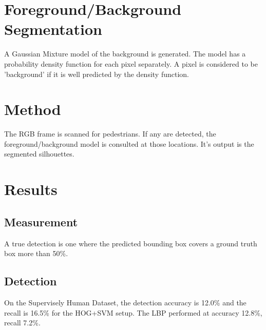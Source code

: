 \documentclass{article}
\begin{document}
\section{Foreground/Background Segmentation}
A Gaussian Mixture model of the background is generated\cite{knn_background_subt}.
The model has a probability density function for each pixel separately.
A pixel is considered to be 'background' if it is well predicted by the density function.


\section{Method}
The RGB frame is scanned for pedestrians.
If any are detected, the foreground/background model is consulted at those locations.
It's output is the segmented silhouettes.


\section{Results}
\subsection{Measurement}
A true detection is one where the predicted bounding box covers a ground truth box more than 50\%.

\subsection{Detection}
On the Supervisely Human Dataset, the detection accuracy is 12.0\% and the recall is 16.5\% for the HOG+SVM setup.
The LBP performed at accuracy 12.8\%, recall 7.2\%.
\end{document}
